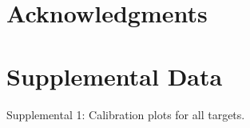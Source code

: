 \documentclass[10pt,article]{memoir}
\begin{document}
\section*{Acknowledgments}




\section*{Supplemental Data}
%
%

Supplemental 1: Calibration plots for all targets.
\end{document}
